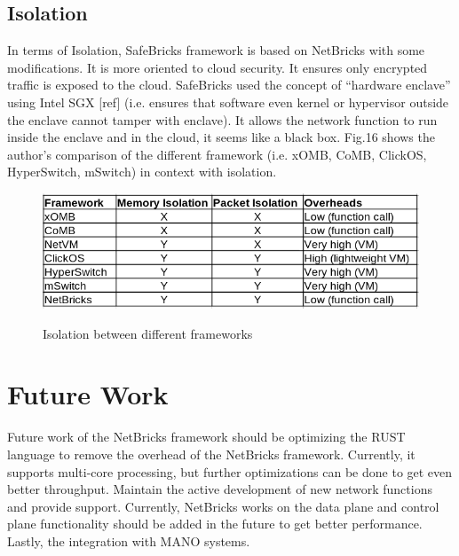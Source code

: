 \documentclass[10pt, a4paper, conference]{IEEEtran}
\begin{document}
\subsection{Isolation}
In terms of Isolation, SafeBricks \cite{Poddar2018} framework is based on NetBricks with some modifications. It is more oriented to cloud security. It ensures only encrypted traffic is exposed to the cloud. SafeBricks used the concept of “hardware enclave” using Intel SGX [ref] (i.e. ensures that software even kernel or hypervisor outside the enclave cannot tamper with enclave). It allows the network function to run inside the enclave and in the cloud, it seems like a black box. Fig.16 shows the author’s comparison of the different framework (i.e. xOMB\cite{Anderson2012}, CoMB\cite{Sekar}, ClickOS\cite{Martins2014}, HyperSwitch\cite{Ram2013}, mSwitch\cite{Honda2015}) in context with isolation.
\begin{figure}
	\centering
	\includegraphics[width=\linewidth]{figures/fig14}
	\caption{Isolation between different frameworks}
	\cite{Panda2016}
	\label{key16}
\end{figure}
\section{Future Work}
Future work of the NetBricks framework should be optimizing the RUST language to remove the overhead of the NetBricks framework. Currently, it supports multi-core processing, but further optimizations can be done to get even better throughput. Maintain the active development of new network functions and provide support. Currently, NetBricks works on the data plane and control plane functionality should be added in the future to get better performance. Lastly, the integration with MANO systems.
\label{sec:conclusion}







\end{document}
